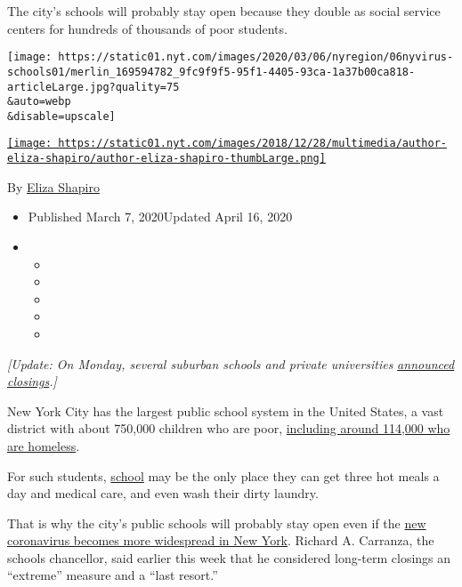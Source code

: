 The city's schools will probably stay open because they double as social
service centers for hundreds of thousands of poor students.

\texttt{[image: https://static01.nyt.com/images/2020/03/06/nyregion/06nyvirus-schools01/merlin\_169594782\_9fc9f9f5-95f1-4405-93ca-1a37b00ca818-articleLarge.jpg?quality=75\\\&auto=webp\\\&disable=upscale]}

\href{https://www.nytimes.com/by/eliza-shapiro}{\texttt{[image: https://static01.nyt.com/images/2018/12/28/multimedia/author-eliza-shapiro/author-eliza-shapiro-thumbLarge.png]}}

By \href{https://www.nytimes.com/by/eliza-shapiro}{Eliza Shapiro}

\begin{itemize}
\item
  Published March 7, 2020Updated April 16, 2020
\item
  \begin{itemize}
  \item
  \item
  \item
  \item
  \item
  \end{itemize}
\end{itemize}

\emph{{[}Update: On Monday, several suburban schools and private
universities}
\href{https://www.nytimes.com/2020/03/09/nyregion/coronavirus-new-york.html}{\emph{announced
closings}}\emph{.{]}}

New York City has the largest public school system in the United States,
a vast district with about 750,000 children who are poor,
\href{https://www.nytimes.com/interactive/2019/11/19/nyregion/student-homelessness-nyc.html}{including
around 114,000 who are homeless}.

For such students,
\href{https://www.nytimes.com/2020/04/16/nyregion/special-education-coronavirus-nyc.html}{school}
may be the only place they can get three hot meals a day and medical
care, and even wash their dirty laundry.

That is why the city's public schools will probably stay open even if
the
\href{https://www.nytimes.com/2020/03/07/nyregion/coronavirus-new-york-queens.html}{new
coronavirus becomes more widespread in New York}. Richard A. Carranza,
the schools chancellor, said earlier this week that he considered
long-term closings an ``extreme'' measure and a ``last resort.''

